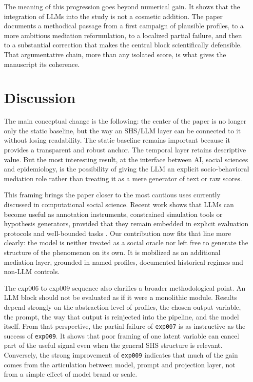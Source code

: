 \documentclass[ROIA,Unicode]{cedram}
\begin{document}
The meaning of this progression goes beyond numerical gain. It shows that the integration of LLMs into the study is not a cosmetic addition. The paper documents a methodical passage from a first campaign of plausible profiles, to a more ambitious mediation reformulation, to a localized partial failure, and then to a substantial correction that makes the central block scientifically defensible. That argumentative chain, more than any isolated score, is what gives the manuscript its coherence.

\section{Discussion}
The main conceptual change is the following: the center of the paper is no longer only the static baseline, but the way an SHS/LLM layer can be connected to it without losing readability. The static baseline remains important because it provides a transparent and robust anchor. The temporal layer retains descriptive value. But the most interesting result, at the interface between AI, social sciences and epidemiology, is the possibility of giving the LLM an explicit socio-behavioral mediation role rather than treating it as a mere generator of text or raw scores.

This framing brings the paper closer to the most cautious uses currently discussed in computational social science. Recent work shows that LLMs can become useful as annotation instruments, constrained simulation tools or hypothesis generators, provided that they remain embedded in explicit evaluation protocols and well-bounded tasks \citep{argyle2023out,park2023generative,horton2023homo,ziems2024css}. Our contribution now fits that line more clearly: the model is neither treated as a social oracle nor left free to generate the structure of the phenomenon on its own. It is mobilized as an additional mediation layer, grounded in named profiles, documented historical regimes and non-LLM controls.

The exp006 to exp009 sequence also clarifies a broader methodological point. An LLM block should not be evaluated as if it were a monolithic module. Results depend strongly on the abstraction level of profiles, the chosen output variable, the prompt, the way that output is reinjected into the pipeline, and the model itself. From that perspective, the partial failure of \texttt{exp007} is as instructive as the success of \texttt{exp009}. It shows that poor framing of one latent variable can cancel part of the useful signal even when the general SHS structure is relevant. Conversely, the strong improvement of \texttt{exp009} indicates that much of the gain comes from the articulation between model, prompt and projection layer, not from a simple effect of model brand or scale.
\end{document}
